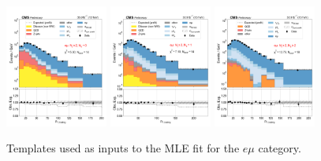 \begin{figure}[htb!]
    \includegraphics[width=0.3\textwidth]{chapters/Analysis/sectionStatisticalAnalysis/figures/fit/emu_cat_gt2_eq0}
    \includegraphics[width=0.3\textwidth]{chapters/Analysis/sectionStatisticalAnalysis/figures/fit/emu_cat_gt2_eq1_a}
    \includegraphics[width=0.3\textwidth]{chapters/Analysis/sectionStatisticalAnalysis/figures/fit/emu_cat_gt2_gt2_a}
    \caption{Templates used as inputs to the MLE fit for the $e\mu$
    category.}
    \label{fig:fits_templates_emu}
\end{figure}

